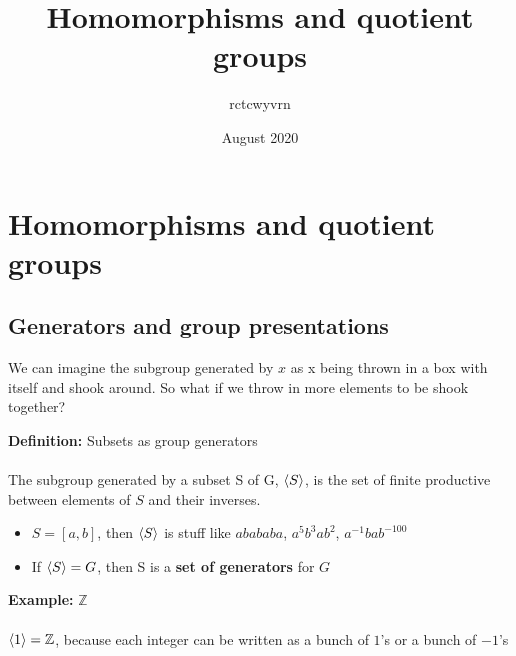 \documentclass{article}
\title{Homomorphisms and quotient groups}
\author{rctcwyvrn }
\date{August 2020}
\newcommand{\Z}{\mathbb{Z}}
\begin{document}
\maketitle


\section{Homomorphisms and quotient groups}
\subsection{Generators and group presentations}
We can imagine the subgroup generated by $x$ as x being thrown in a box with itself and shook around. So what if we throw in more elements to be shook together? 
\begin{definition} 
\textbf{Definition:} Subsets as group generators \\
~\\
The subgroup generated by a subset S of G, $\braket{S}$, is the set of finite productive between elements of $S$ and their inverses. 
\begin{itemize}
	\item $S = [a,b]$, then $\braket{S}$ is stuff like $abababa$, $a^5b^3ab^2$, $a^{-1}bab^{-100}$
	\item If $\braket{S}=G$, then S is a {\color{blue} \textbf{set of generators}} for $G$
\end{itemize}
\end{definition}
\begin{example} 
\textbf{Example:} $\Z$ \\
~\\
$\braket{1} = \Z$, because each integer can be written as a bunch of $1$'s or a bunch of $-1$'s
\end{example}
\end{document}
